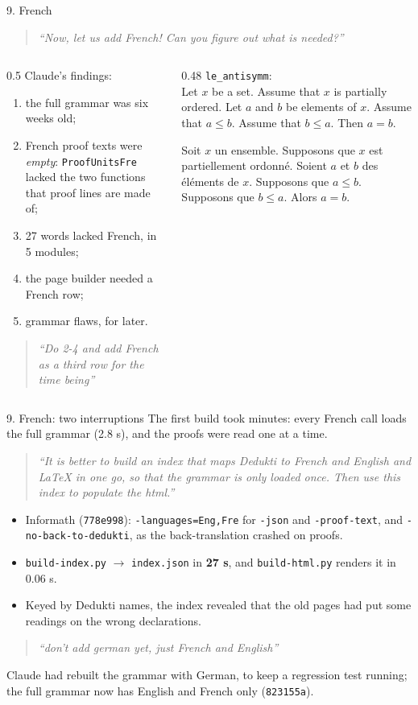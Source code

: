 \documentclass[10pt,aspectratio=169]{beamer}
\newcommand{\bad}[1]{\textcolor{warn}{#1}}
\newcommand{\commit}[1]{\texttt{\footnotesize #1}}
\newcommand{\prompt}[1]{\begin{quote}\small\itshape ``#1''\end{quote}}
\begin{document}
\begin{frame}{9. French}
  \prompt{Now, let us add French! Can you figure out what is needed?}
  \begin{columns}[T]
    \begin{column}{0.5\textwidth}
      Claude's findings:
      \begin{enumerate}
        \item the full grammar was six weeks old;
        \item French proof texts were \emph{empty}: \texttt{ProofUnitsFre}
              lacked the two functions that proof lines are made of;
        \item 27 words lacked French, in 5 modules;
        \item the page builder needed a French row;
        \item grammar flaws, for later.
      \end{enumerate}
      \prompt{Do 2-4 and add French as a third row for the time being}
    \end{column}
    \begin{column}{0.48\textwidth}
      \small
      \texttt{le\_antisymm}:\\
      Let $x$ be a set. Assume that $x$ is partially ordered. Let $a$ and $b$
      be elements of $x$. Assume that $a \leq b$. Assume that $b \leq a$.
      Then $a = b$.

      \vspace{1mm}
      Soit $x$ un ensemble. Supposons que $x$ est partiellement ordonné.
      Soient $a$ et $b$ des éléments de $x$. Supposons que $a \leq b$.
      Supposons que $b \leq a$. Alors $a = b$.
    \end{column}
  \end{columns}
\end{frame}

\begin{frame}{9. French: two interruptions}
  \small
  The first build took minutes: every French call loads the full grammar
  (2.8 s), and the proofs were read one at a time.
  \prompt{It is better to build an index that maps Dedukti to French and
  English and LaTeX in one go, so that the grammar is only loaded once. Then
  use this index to populate the html.}
  \begin{itemize}
    \item Informath (\commit{778e998}): \texttt{-languages=Eng,Fre} for
          \texttt{-json} and \texttt{-proof-text}, and \texttt{-no-back-to-dedukti},
          as the back-translation crashed on proofs.
    \item \texttt{build-index.py} $\to$ \texttt{index.json} in \textbf{27 s}, and
          \texttt{build-html.py} renders it in 0.06 s.
    \item Keyed by Dedukti names, the index revealed that the old pages had
          put some readings on the \bad{wrong declarations}.
  \end{itemize}
  \prompt{don't add german yet, just French and English}
  Claude had rebuilt the grammar with German, to keep a regression test
  running; the full grammar now has English and French only (\commit{823155a}).
\end{frame}
\end{document}
